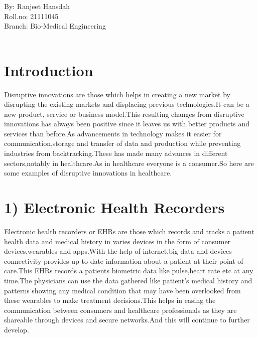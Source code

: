 \documentclass{article}[A4,12pt]
\begin{document}

\large By: Ranjeet Hansdah\\

\large Roll.no: 21111045\\

\large Branch: Bio-Medical Engineering\\~\\
\newpage
\section*{Introduction}
Disruptive innovations are those which helps in creating a new market by disrupting the existing markets and displacing  previous technologies.It can be a new product, service or business model.This resulting changes from disruptive innovations has always been positive since it leaves us with better products and services than before.As advancements in technology makes it easier for communication,storage and transfer of data and production while preventing industries from backtracking.These has made many advances in different sectors,notably in healthcare.As in healthcare everyone is a consumer.So here are some examples of disruptive innovations in healthcare.

\section*{1) Electronic Health Recorders}
Electronic health recorders or EHRs are those which records and tracks a patient health data and medical history in varies devices in the form of consumer devices,wearables and apps.With the help of internet,big data and devices connectivity provides up-to-date information about a patient at their point of care.This EHRs records a patients biometric data like pulse,heart rate etc at any time.The physicians can use the data gathered like patient's medical history and patterns showing any medical condition that may have been overlooked from these wearables  to make treatment decisions.This helps in easing the communication between consumers and healthcare professionals as they are shareable through devices and secure networks.And this will continue to further develop.
 
\end{document}

